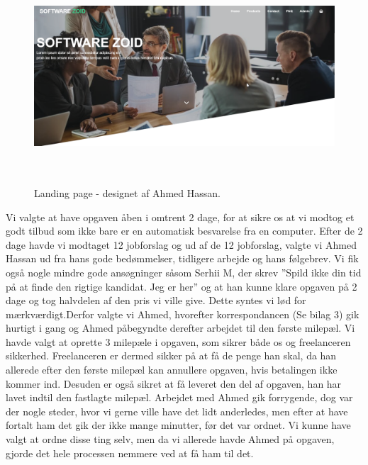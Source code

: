 \documentclass[11pt]{report}
\begin{document}
\begin{figure}[H]
  \centering
    \includegraphics[height=8cm, width=15cm]{LandingPage.png}
    \caption*{Landing page - designet af Ahmed Hassan.}
\end{figure}

Vi valgte at have opgaven åben i omtrent 2 dage, for at sikre os at vi modtog et godt tilbud som ikke bare er en automatisk besvarelse fra en computer. Efter de 2 dage havde vi modtaget 12 jobforslag og ud af de 12 jobforslag, valgte vi Ahmed Hassan ud fra hans gode bedømmelser, tidligere arbejde og hans følgebrev. Vi fik også nogle mindre gode ansøgninger såsom Serhii M, der skrev ”Spild ikke din tid på at finde den rigtige kandidat. Jeg er her” og at han kunne klare opgaven på 2 dage og tog halvdelen af den pris vi ville give. Dette syntes vi lød for mærkværdigt.Derfor valgte vi Ahmed, hvorefter korrespondancen (Se bilag 3) gik hurtigt i gang og Ahmed påbegyndte derefter arbejdet til den første milepæl. Vi havde valgt at oprette 3 milepæle i opgaven, som sikrer både os og freelanceren sikkerhed. Freelanceren er dermed sikker på at få de penge han skal, da han allerede efter den første milepæl kan annullere opgaven, hvis betalingen ikke kommer ind. Desuden er også sikret at få leveret den del af opgaven, han har lavet indtil den fastlagte milepæl. Arbejdet med Ahmed gik forrygende, dog var der nogle steder, hvor vi gerne ville have det lidt anderledes, men efter at have fortalt ham det gik der ikke mange minutter, før det var ordnet. Vi kunne have valgt at ordne disse ting selv, men da vi allerede havde Ahmed på opgaven, gjorde det hele processen nemmere ved at få ham til det.
\end{document}
